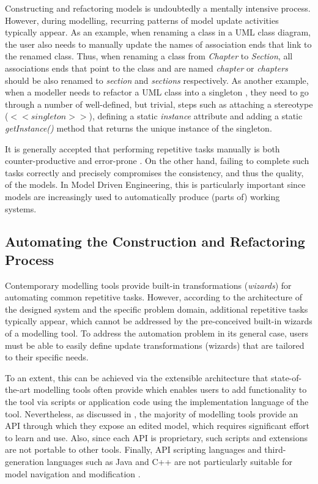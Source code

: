 Constructing and refactoring models is undoubtedly a mentally intensive process. However, during modelling, recurring patterns of model update activities typically appear. As an example, when renaming a class in a UML class diagram, the user also needs to manually update the names of association ends that link to the renamed class. Thus, when renaming a class from \emph{Chapter} to \emph{Section}, all associations ends that point to the class and are named \emph{chapter} or \emph{chapters} should be also renamed to \emph{section} and \emph{sections} respectively. As another example, when a modeller needs to refactor a UML class into a singleton \cite{Larman}, they need to go through a number of well-defined, but trivial, steps such as attaching a stereotype ($<<singleton>>$), defining a static \emph{instance} attribute and adding a static \emph{getInstance()} method that returns the unique instance of the singleton.

It is generally accepted that performing repetitive tasks manually is both counter-productive and error-prone \cite{CG.InAction}. On the other hand, failing to complete such tasks correctly and precisely compromises the consistency, and thus the quality, of the models. In Model Driven Engineering, this is particularly important since models are increasingly used to automatically produce (parts of) working systems. 

\subsection{Automating the Construction and Refactoring Process}

Contemporary modelling tools provide built-in transformations (\textit{wizards}) for automating common repetitive tasks. However, according to the architecture of the designed system and the specific problem domain, additional repetitive tasks typically appear, which cannot be addressed by the pre-conceived built-in wizards of a modelling tool. To address the automation problem in its general case, users must be able to easily define update transformations (wizards) that are tailored to their specific needs.

To an extent, this can be achieved via the extensible architecture that state-of-the-art modelling tools often provide which enables users to add functionality to the tool via scripts or application code using the implementation language of the tool. Nevertheless, as discussed in \cite{EOL}, the majority of modelling tools provide an API through which they expose an edited model, which requires significant effort to learn and use. Also, since each API is proprietary, such scripts and extensions are not portable to other tools. Finally, API scripting languages and third-generation languages such as Java and C++ are not particularly suitable for model navigation and modification \cite{EOL}.

